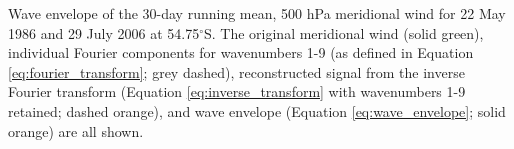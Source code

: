 \label{fig:example_hilbert}
Wave envelope of the 30-day running mean, 500 hPa meridional wind for 22 May 1986 and 29 July 2006 at 54.75$^{\circ}$S. The original meridional wind (solid green), individual Fourier components for wavenumbers 1-9 (as defined in Equation \ref{eq:fourier_transform}; grey dashed), reconstructed signal from the inverse Fourier transform (Equation \ref{eq:inverse_transform} with wavenumbers 1-9 retained; dashed orange), and wave envelope (Equation \ref{eq:wave_envelope}; solid orange) are all shown.